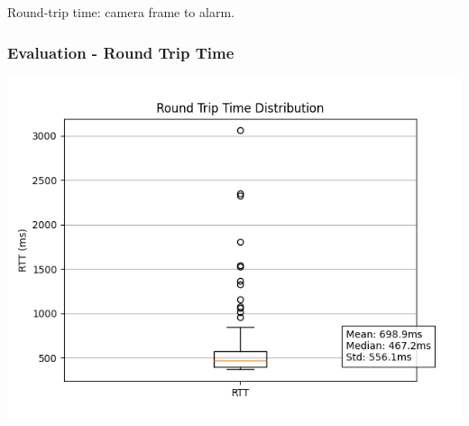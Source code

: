\documentclass{beamer}
\begin{document}
\begin{frame}
    Round-trip time: camera frame to alarm.
    \frametitle{Evaluation - Round Trip Time}

    \begin{center}
        \includegraphics[width=0.8\linewidth]{./res/rtt_distribution.png}        
    \end{center}
\end{frame}
\end{document}
